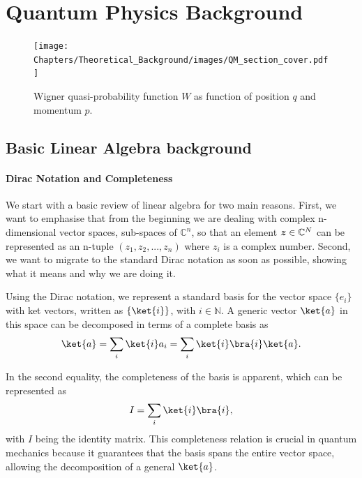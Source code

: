 \chapter{Quantum Physics Background}\label{ch:qm_background}

\begin{figure}[h]
    \centering
    \texttt{[image: Chapters/Theoretical\_Background/images/QM\_section\_cover.pdf]}
    \caption{Wigner quasi-probability function $W$ as function of position $q$ and momentum $p$.}
    \label{fig:QM_section_cover}
\end{figure}

\section{Basic Linear Algebra background}
\subsubsection{Dirac Notation and Completeness}
We start with a basic review of linear algebra for two main reasons. First, we want to emphasise that from the beginning we are dealing with complex n-dimensional vector spaces, sub-spaces of $\mathbb{C}^n$, so that an element $\boldsymbol{z} \in \mathbb{C}^N$ can be represented as an n-tuple $(z_1, z_2, ..., z_n)$ where $z_i$ is a complex number. Second, we want to migrate to the standard Dirac notation as soon as possible, showing what it means and why we are doing it.

Using the Dirac notation, we represent a standard basis for the vector space $\{e_i\}$ with ket vectors, written as $\{\ket{i}\}$, with $i \in \mathbb{N}$. A generic vector $\ket{a}$ in this space can be decomposed in terms of a complete basis as
\begin{align*}
    \ket{a} =  \sum_i \ket{i}a_i = \sum_i \ket{i}\bra{i}\ket{a}.
\end{align*}

In the second equality, the completeness of the basis is apparent, which can be represented as 
\begin{align*}
    I =  \sum_i\ket{i}\bra{i},
\end{align*}
with $I$ being the identity matrix. This completeness relation is crucial in quantum mechanics because it guarantees that the basis spans the entire vector space, allowing the decomposition of a general $\ket{a}$.

